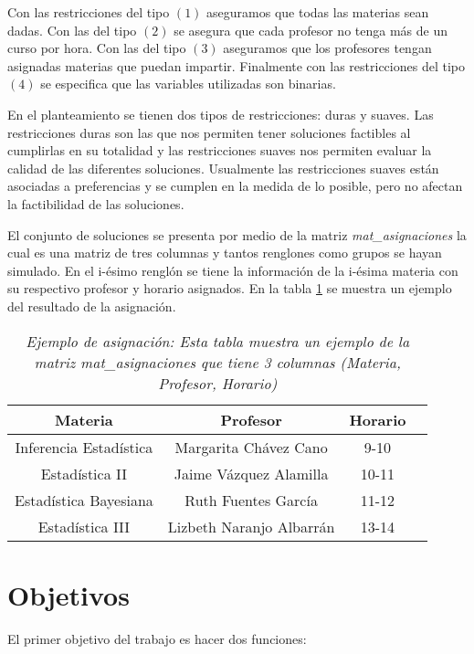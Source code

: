 Con las restricciones del tipo $(1)$ aseguramos que todas las materias sean dadas. Con las del tipo $(2)$ se asegura que cada profesor no tenga más de un curso por hora. Con las del tipo $(3)$ aseguramos que los profesores tengan asignadas materias que puedan impartir. Finalmente con las restricciones del tipo $(4)$ se especifica que las variables utilizadas son binarias.

En el planteamiento se tienen dos tipos de restricciones: duras y suaves. Las restricciones duras son las que nos permiten tener soluciones factibles al cumplirlas en su totalidad y las restricciones suaves nos permiten evaluar la calidad de las diferentes soluciones. Usualmente las restricciones suaves están asociadas a preferencias y se cumplen en la medida de lo posible, pero no afectan la factibilidad de las soluciones.

El conjunto de soluciones se presenta por medio de la matriz \textit{mat\_asignaciones} la cual es una matriz de tres columnas y tantos renglones como grupos se hayan simulado. En el i-ésimo renglón se tiene la información de la i-ésima materia con su respectivo profesor y horario asignados. En la tabla \ref{EjAsig} se muestra un ejemplo del resultado de la asignación.

\begin{table}[H]
\centering
\begin{tabular}{|c|c|c|c|}
 \hline 
 \textbf{Materia} & \textbf{Profesor} & \textbf{Horario} \\ 
 \hline 
 Inferencia Estadística & Margarita Chávez Cano & 9-10 \\ 
 \hline 
 Estadística II & Jaime Vázquez Alamilla & 10-11 \\ 
 \hline 
 Estadística Bayesiana  & Ruth Fuentes García & 11-12 \\ 
 \hline 
 Estadística III  & Lizbeth Naranjo Albarrán & 13-14 \\ 
 \hline 
 \end{tabular}  
\caption[\textit{Ejemplo de asignación}]{\textit{Ejemplo de asignación: Esta tabla muestra un ejemplo de la matriz mat\_asignaciones que tiene 3 columnas (Materia, Profesor, Horario)}}\label{EjAsig}
\end{table}


\section{Objetivos}

El primer objetivo del trabajo es hacer dos funciones:


